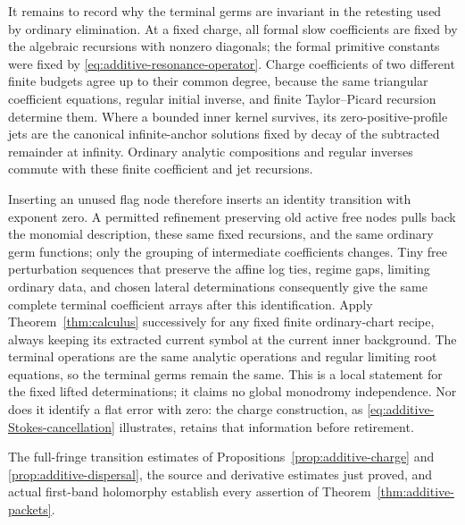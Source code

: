 It remains to record why the terminal germs are invariant in the
retesting used by ordinary elimination.  At a fixed charge, all formal
slow coefficients are fixed by the algebraic recursions with nonzero
diagonals; the formal primitive constants were fixed by
\eqref{eq:additive-resonance-operator}.  Charge coefficients of two
different finite budgets agree up to their common degree, because the
same triangular coefficient equations, regular initial inverse, and
finite Taylor--Picard recursion determine them.  Where a bounded inner
kernel survives, its zero-positive-profile jets are the canonical
infinite-anchor solutions fixed by decay of the subtracted remainder
at infinity.  Ordinary analytic compositions and regular inverses
commute with these finite coefficient and jet recursions.

Inserting an unused flag node therefore inserts an identity transition
with exponent zero.  A permitted refinement preserving old active free
nodes pulls back the monomial description, these same fixed recursions,
and the same ordinary germ functions;
only the grouping of intermediate coefficients changes.  Tiny free
perturbation sequences that preserve the affine log ties, regime gaps,
limiting ordinary data, and chosen lateral determinations consequently
give the same complete terminal coefficient arrays after this
identification.  Apply Theorem~\ref{thm:calculus} successively for any
fixed finite ordinary-chart recipe, always keeping its extracted
current symbol at the current inner background.  The terminal
operations are the same analytic operations and regular limiting root
equations, so the terminal germs remain the same.  This is a local
statement for the fixed lifted determinations; it claims no global
monodromy independence.  Nor does it identify a flat error with zero:
the charge construction, as \eqref{eq:additive-Stokes-cancellation}
illustrates, retains that information before retirement.

The full-fringe transition estimates of
Propositions~\ref{prop:additive-charge} and
\ref{prop:additive-dispersal}, the source and derivative estimates just
proved, and actual first-band holomorphy establish every assertion of
Theorem~\ref{thm:additive-packets}.
